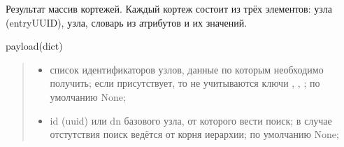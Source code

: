 \documentclass[a4paper,10pt,russian]{sphinxmanual}
\begin{document}
\begin{fulllineitems}
\begin{fulllineitems}
\sphinxAtStartPar
Результат \sphinxhyphen{} массив кортежей. Каждый кортеж состоит из трёх элементов:
 узла (entryUUID),  узла, словарь из атрибутов и их значений.
\begin{description}
\sphinxAtStartPar
payload(dict) \sphinxhyphen{}
\begin{quote}

\begin{sphinxVerbatim}[commandchars=\\\{\}]
\PYG{p}{[}\PYG{p}{],}
\PYG{p}{[}\PYG{p}{],}
\PYG{p}{[}\PYG{p}{]}
\PYG{p}{[}\PYG{p}{]}
\end{sphinxVerbatim}
\begin{itemize}
\item {} \begin{description}
\sphinxAtStartPar
список идентификаторов узлов, данные по которым
необходимо получить; если присутствует, то не учитываются ключи
, , ; по умолчанию \sphinxhyphen{} None;

\end{description}

\item {} \begin{description}
\sphinxAtStartPar
id (uuid) или dn базового узла, от которого
вести поиск;
в случае отстутствия поиск ведётся от корня иерархии; по
умолчанию \sphinxhyphen{} None;


\end{description}
\end{itemize}
\end{quote}
\end{description}
\end{fulllineitems}
\end{fulllineitems}
\end{document}
